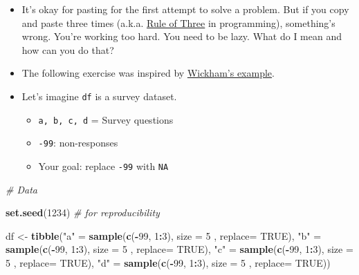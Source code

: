 \documentclass[
]{book}
\newenvironment{Shaded}{\begin{snugshade}}{\end{snugshade}}
\newcommand{\CommentTok}[1]{\textcolor[rgb]{0.56,0.35,0.01}{\textit{#1}}}
\newcommand{\DataTypeTok}[1]{\textcolor[rgb]{0.13,0.29,0.53}{#1}}
\newcommand{\DecValTok}[1]{\textcolor[rgb]{0.00,0.00,0.81}{#1}}
\newcommand{\KeywordTok}[1]{\textcolor[rgb]{0.13,0.29,0.53}{\textbf{#1}}}
\newcommand{\NormalTok}[1]{#1}
\newcommand{\OperatorTok}[1]{\textcolor[rgb]{0.81,0.36,0.00}{\textbf{#1}}}
\newcommand{\OtherTok}[1]{\textcolor[rgb]{0.56,0.35,0.01}{#1}}
\newcommand{\StringTok}[1]{\textcolor[rgb]{0.31,0.60,0.02}{#1}}
\begin{document}
\begin{itemize}
\item
  It's okay for pasting for the first attempt to solve a problem. But if you copy and paste three times (a.k.a. \href{https://en.wikipedia.org/wiki/Rule_of_three_(computer_programming)}{Rule of Three} in programming), something's wrong. You're working too hard. You need to be lazy. What do I mean and how can you do that?
\item
  The following exercise was inspired by \href{http://adv-r.had.co.nz/Functional-programming.html}{Wickham's example}.
\item
  Let's imagine \texttt{df} is a survey dataset.

  \begin{itemize}
  \item
    \texttt{a,\ b,\ c,\ d} = Survey questions
  \item
    \texttt{-99}: non-responses
  \item
    Your goal: replace \texttt{-99} with \texttt{NA}
  \end{itemize}
\end{itemize}

\begin{Shaded}
\begin{Highlighting}[]
\CommentTok{\# Data}

\KeywordTok{set.seed}\NormalTok{(}\DecValTok{1234}\NormalTok{) }\CommentTok{\# for reproducibility }

\NormalTok{df \textless{}{-}}\StringTok{ }\KeywordTok{tibble}\NormalTok{(}\StringTok{"a"}\NormalTok{ =}\StringTok{ }\KeywordTok{sample}\NormalTok{(}\KeywordTok{c}\NormalTok{(}\OperatorTok{{-}}\DecValTok{99}\NormalTok{, }\DecValTok{1}\OperatorTok{:}\DecValTok{3}\NormalTok{), }\DataTypeTok{size =} \DecValTok{5}\NormalTok{ , }\DataTypeTok{replace=} \OtherTok{TRUE}\NormalTok{),}
             \StringTok{"b"}\NormalTok{ =}\StringTok{ }\KeywordTok{sample}\NormalTok{(}\KeywordTok{c}\NormalTok{(}\OperatorTok{{-}}\DecValTok{99}\NormalTok{, }\DecValTok{1}\OperatorTok{:}\DecValTok{3}\NormalTok{), }\DataTypeTok{size =} \DecValTok{5}\NormalTok{ , }\DataTypeTok{replace=} \OtherTok{TRUE}\NormalTok{),}
             \StringTok{"c"}\NormalTok{ =}\StringTok{ }\KeywordTok{sample}\NormalTok{(}\KeywordTok{c}\NormalTok{(}\OperatorTok{{-}}\DecValTok{99}\NormalTok{, }\DecValTok{1}\OperatorTok{:}\DecValTok{3}\NormalTok{), }\DataTypeTok{size =} \DecValTok{5}\NormalTok{ , }\DataTypeTok{replace=} \OtherTok{TRUE}\NormalTok{),}
             \StringTok{"d"}\NormalTok{ =}\StringTok{ }\KeywordTok{sample}\NormalTok{(}\KeywordTok{c}\NormalTok{(}\OperatorTok{{-}}\DecValTok{99}\NormalTok{, }\DecValTok{1}\OperatorTok{:}\DecValTok{3}\NormalTok{), }\DataTypeTok{size =} \DecValTok{5}\NormalTok{ , }\DataTypeTok{replace=} \OtherTok{TRUE}\NormalTok{))}
\end{Highlighting}
\end{Shaded}
\end{document}
